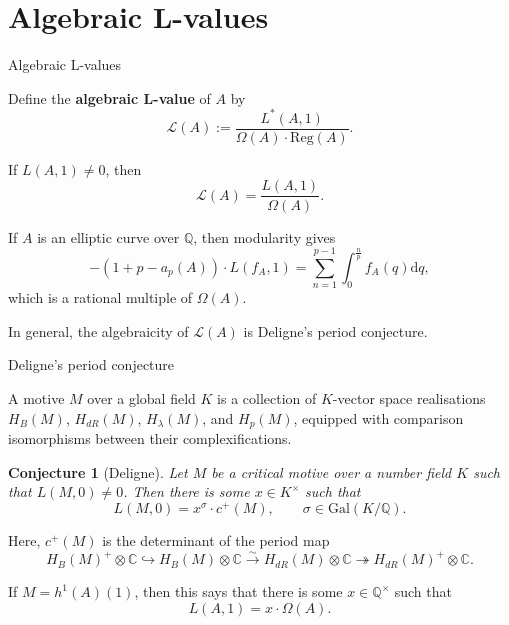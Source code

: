 \documentclass[10pt]{beamer}
\newtheorem{conjecture}{Conjecture}
\begin{document}
\section{Algebraic L-values}

\begin{frame}[t]{Algebraic L-values}

Define the \textbf{algebraic L-value} of $ A $ by
$$ \mathcal{L}(A) := \dfrac{L^*(A, 1)}{\Omega(A) \cdot \mathrm{Reg}(A)}. $$

\pause

If $ L(A, 1) \ne 0 $, then
$$ \mathcal{L}(A) = \dfrac{L(A, 1)}{\Omega(A)}. $$

\pause

If $ A $ is an elliptic curve over $ \mathbb{Q} $, then modularity gives
$$ -(1 + p - a_p(A)) \cdot L(f_A, 1) = \sum_{n = 1}^{p - 1} \int_0^{\tfrac{n}{p}} f_A(q)\mathrm{d}q, $$
which is a rational multiple of $ \Omega(A) $.

\pause

\vspace{0.5cm} In general, the algebraicity of $ \mathcal{L}(A) $ is Deligne's period conjecture.

\end{frame}

\begin{frame}[t]{Deligne's period conjecture}

A motive $ M $ over a global field $ K $ is a collection of $ K $-vector space realisations $ H_B(M) $, $ H_{dR}(M) $, $ H_\lambda(M) $, and $ H_p(M) $, equipped with comparison isomorphisms between their complexifications.

\pause

\begin{conjecture}[Deligne]
Let $ M $ be a critical motive over a number field $ K $ such that $ L(M, 0) \ne 0 $. Then there is some $ x \in K^\times $ such that
$$ L(M, 0) = x^\sigma \cdot c^+(M), \qquad \sigma \in \mathrm{Gal}(K / \mathbb{Q}). $$
\end{conjecture}

Here, $ c^+(M) $ is the determinant of the period map
$$ H_B(M)^+ \otimes \mathbb{C} \hookrightarrow H_B(M) \otimes \mathbb{C} \xrightarrow{\sim} H_{dR}(M) \otimes \mathbb{C} \twoheadrightarrow H_{dR}(M)^+ \otimes \mathbb{C}. $$

\pause

If $ M = h^1(A)(1) $, then this says that there is some $ x \in \mathbb{Q}^\times $ such that
$$ L(A, 1) = x \cdot \Omega(A). $$

\end{frame}
\end{document}
